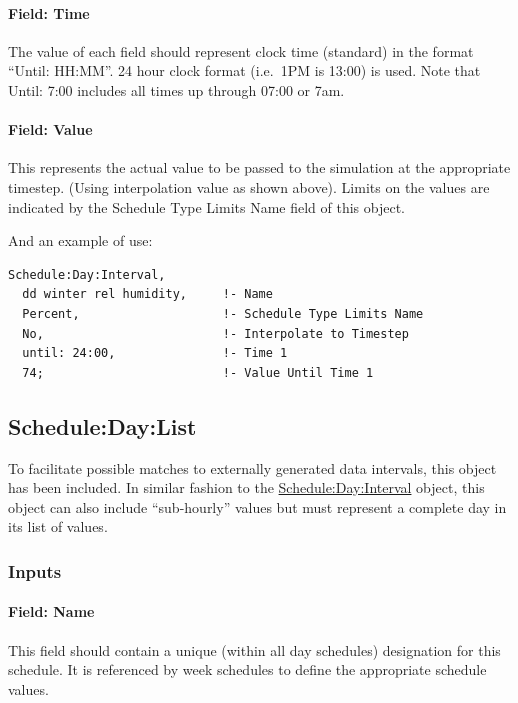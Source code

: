 \paragraph{Field: Time}\label{field-time}

The value of each field should represent clock time (standard) in the format ``Until: HH:MM''. 24 hour clock format (i.e.~1PM is 13:00) is used. Note that Until: 7:00 includes all times up through 07:00 or 7am.

\paragraph{Field: Value}\label{field-value}

This represents the actual value to be passed to the simulation at the appropriate timestep. (Using interpolation value as shown above). Limits on the values are indicated by the Schedule Type Limits Name field of this object.

And an example of use:

\begin{lstlisting}
Schedule:Day:Interval,
  dd winter rel humidity,     !- Name
  Percent,                    !- Schedule Type Limits Name
  No,                         !- Interpolate to Timestep
  until: 24:00,               !- Time 1
  74;                         !- Value Until Time 1
\end{lstlisting}

\subsection{Schedule:Day:List}\label{scheduledaylist}

To facilitate possible matches to externally generated data intervals, this object has been included. In similar fashion to the \hyperref[scheduledayinterval]{Schedule:Day:Interval} object, this object can also include ``sub-hourly'' values but must represent a complete day in its list of values.

\subsubsection{Inputs}\label{inputs-3-032}

\paragraph{Field: Name}\label{field-name-3-028}

This field should contain a unique (within all day schedules) designation for this schedule. It is referenced by week schedules to define the appropriate schedule values.

